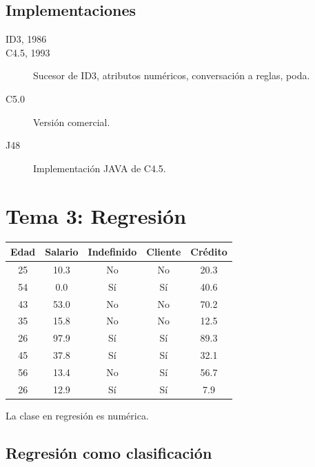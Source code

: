 \documentclass[12pt, twoside, openright]{report} %
\begin{document}
\section{Implementaciones}

\begin{description}
	\item[ID3, 1986]
	\item[C4.5, 1993] Sucesor de ID3, atributos numéricos, conversación a reglas, poda.
	\item[C5.0] Versión comercial.
	\item[J48] Implementación JAVA de C4.5.
\end{description}

\chapter{Tema 3: Regresión}
\begin{table}[h]
	\begin{tabular}{c|c|c|c|c}
		\textbf{Edad} & \textbf{Salario} & \textbf{Indefinido} & \textbf{Cliente} & \textbf{Crédito} \\ \hline
		25            & 10.3             & No                  & No               & 20.3             \\
		54            & 0.0              & Sí                  & Sí               & 40.6             \\
		43            & 53.0             & No                  & No               & 70.2             \\
		35            & 15.8             & No                  & No               & 12.5             \\
		26            & 97.9             & Sí                  & Sí               & 89.3             \\
		45            & 37.8             & Sí                  & Sí               & 32.1             \\
		56            & 13.4             & No                  & Sí               & 56.7             \\
		26            & 12.9             & Sí                  & Sí               & 7.9              \\ \hline
	\end{tabular}
\end{table}
La clase en regresión es numérica.

\section{Regresión como
  clasificación}
\end{document}
